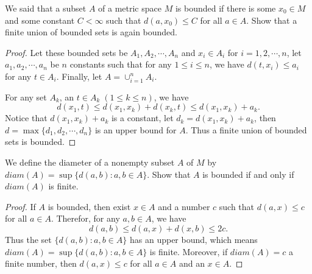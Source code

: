 \documentclass[12pt, a4paper]{article}
\theoremstyle{plain}
\begin{document}
\begin{exercise}{14}
We said that a subset $A$ of a metric space $M$ is bounded if there is some $x_0\in M$ and some constant $C<\infty$ such that $d(a,x_0)\leq C$ for all $a\in A$. Show that a finite union of bounded sets is again bounded.
\end{exercise}
	\begin{proof}
	Let these bounded sets be $A_1,A_2,\cdots ,A_n$ and $x_i\in A_i$ for $i=1,2,\cdots,n$, let $a_1,a_2,\cdots,a_n$ be $n$ constants such that for any $1\leq i\leq n$, we have $d(t,x_i)\leq a_i$ for any $t\in A_i$. Finally, let $A=\cup_{i=1}^{n}{A_i}$.
	
	For any set $A_k$, an $t\in A_k\; (1\leq k\leq n)$, we have 
	\[
	d(x_1,t)\leq d(x_1,x_k)+d(x_k,t)\leq d(x_1,x_k)+a_k.
	\]
	Notice that $d(x_1,x_k)+a_k$ is a constant, let $d_k=d(x_1,x_k)+a_k$, then $d=\max\{d_1,d_2,\cdots,d_n\}$ is an upper bound for $A$. Thus a finite union of bounded sets is bounded.
	\end{proof}

\pagebreak

\begin{exercise}{15}
We define the diameter of a nonempty subset $A$ of $M$ by $diam(A)=\sup\{d(a,b):a,b\in A\}$. Show that $A$ is bounded if and only if $diam (A)$ is finite.
\end{exercise}
	\begin{proof}
	If $A$ is bounded, then exist $x\in A$ and a number $c$ such that $d(a,x)\leq c$ for all $a\in A$. Therefor, for any $a,b\in A$, we have
	\[
	d(a,b)\leq d(a,x)+d(x,b)\leq 2c.
	\]
	Thus the set $\{d(a,b):a,b\in A\}$ has an upper bound, which means $diam(A)=\sup\{d(a,b):a,b\in A\}$ is finite.
	Moreover, if $diam(A)=c$ a finite number, then $d(a,x)\leq c$ for all $a\in A$ and an $x\in A$.
	\end{proof}
	
\end{document}
